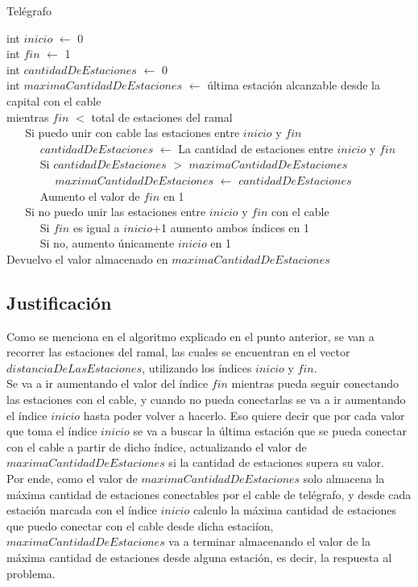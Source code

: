 \documentclass[10pt, a4paper]{article}
\begin{document}
\begin{algorithm}[H]
	\SetAlgoLined
	\caption{Tel\'egrafo}
	int $inicio$ $\leftarrow$ 0\\
	int $fin$ $\leftarrow$ 1\\
	int $cantidadDeEstaciones$ $\leftarrow$ 0\\
	int $maximaCantidadDeEstaciones$ $\leftarrow$ \'ultima estaci\'on alcanzable desde la capital con el cable\\
	mientras $fin$ $<$ total de estaciones del ramal\\
	 $\ \ \ \ \ \ $ Si puedo unir con cable las estaciones entre $inicio$ y $fin$\\
	 $\ \ \ \ \ \ \ \ \ \ \ \ $ $ cantidadDeEstaciones$ $\leftarrow$ La cantidad de estaciones entre $inicio$ y $fin$ \\
	 $\ \ \ \ \ \ \ \ \ \ \ \ $ Si $cantidadDeEstaciones$ $>$ $maximaCantidadDeEstaciones$\\
	 $\ \ \ \ \ \ \ \ \ \ \ \ \ \ \ \ \ \ $ $maximaCantidadDeEstaciones$ $\leftarrow$ $cantidadDeEstaciones$\\
	 $\ \ \ \ \ \ \ \ \ \ \ \ $ Aumento el valor de $fin$ en 1\\
	 $\ \ \ \ \ \ $ Si no puedo unir las estaciones entre $inicio$ y $fin$ con el cable\\
	 $\ \ \ \ \ \ \ \ \ \ \ \ $ Si $fin$ es igual a $inicio$+1 aumento ambos \'indices en 1\\
	 $\ \ \ \ \ \ \ \ \ \ \ \ $ Si no, aumento \'unicamente $inicio$ en 1\\
	 Devuelvo el valor almacenado en $maximaCantidadDeEstaciones$
\end{algorithm}

\subsection{Justificaci\'on}
Como se menciona en el algoritmo explicado en el punto anterior, se van a recorrer las estaciones del ramal, las cuales se encuentran en el vector $distanciaDeLasEstaciones$, utilizando los \'indices $inicio$ y $fin$. \\
Se va a ir aumentando el valor del \'indice $fin$ mientras pueda seguir conectando las estaciones con el cable, y cuando no pueda conectarlas se va a ir aumentando el \'indice $inicio$ hasta poder volver a hacerlo. Eso quiere decir que por cada valor que toma el \'indice $inicio$ se va a buscar la \'ultima estaci\'on que se pueda conectar con el cable a partir de dicho \'indice, actualizando el valor de $maximaCantidadDeEstaciones$ si la cantidad de estaciones supera su valor. \\
Por ende, como el valor de $maximaCantidadDeEstaciones$ solo almacena la m\'axima cantidad de estaciones conectables por el cable de tel\'egrafo, y desde cada estaci\'on marcada con el \'indice $inicio$ calculo la m\'axima cantidad de estaciones que puedo conectar con el cable desde dicha estaci\'ion, $maximaCantidadDeEstaciones$ va a terminar almacenando el valor de la m\'axima cantidad de estaciones desde alguna estaci\'on, es decir, la respuesta al problema.
\end{document}
